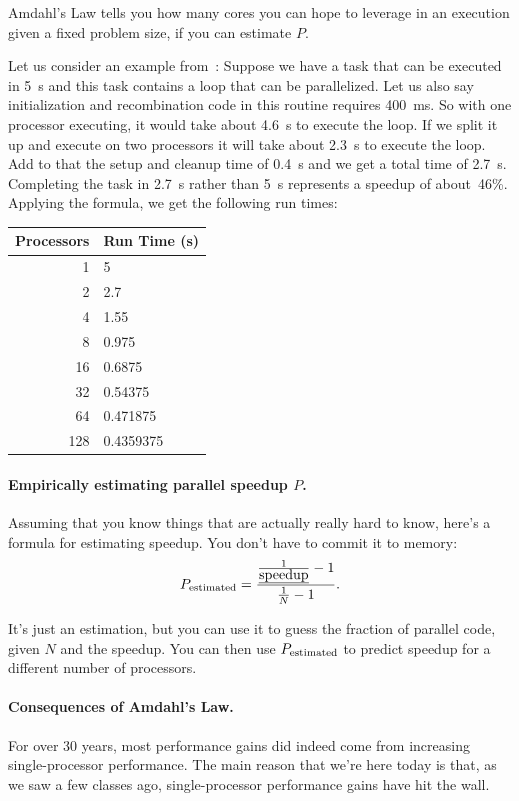 Amdahl's Law tells you how many cores you can hope to leverage in an
execution given a fixed problem size, if you can estimate $P$.

Let us consider an example from~\cite{mte241}: Suppose we have a task that can be executed in 5~s and this task contains a loop that can be parallelized. Let us also say initialization and recombination code in this routine requires 400~ms. So with one processor executing, it would take about 4.6~s to execute the loop. If we split it up and execute on two processors it will take about 2.3~s to execute the loop. Add to that the setup and cleanup time of 0.4~s and we get a total time of 2.7~s. Completing the task in 2.7~s rather than 5~s represents a speedup of about~46\%. Applying the formula, we get the following run times:

\begin{center}
	\begin{tabular}{r|l}
	\textbf{Processors} & \textbf{Run Time (s)} \\ \hline
	1 & 5\\
	2 & 2.7\\
	4 & 1.55\\
	8 & 0.975\\
	16 & 0.6875 \\
	32 & 0.54375 \\
	64 & 0.471875 \\
	128 & 0.4359375\\
	\end{tabular}
\end{center}

   \paragraph{Empirically estimating parallel speedup $P$.}
Assuming that you know things that are actually really hard to know, here's a formula for estimating speedup. You don't have to commit it to memory:
  \[P_{\mbox{\scriptsize estimated}} = \frac{\frac{1}{\mbox{\em speedup}}-1}{\frac{1}{N}-1}.\]

It's just an estimation, but you can use it to guess the fraction of parallel code, given $N$ and the speedup. You can then use $P_{\mbox{\scriptsize estimated}}$ to predict speedup for a different number of processors.

\paragraph{Consequences of Amdahl's Law.}
For over 30 years, most performance gains did indeed come from
increasing single-processor performance. The main reason that we're
here today is that, as we saw a few classes ago,
single-processor performance gains have hit the wall.

